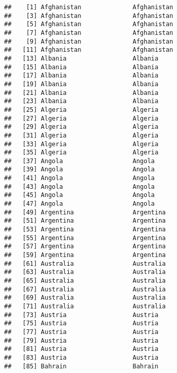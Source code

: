 \documentclass[]{article}
\begin{document}
\begin{verbatim}
##    [1] Afghanistan              Afghanistan             
##    [3] Afghanistan              Afghanistan             
##    [5] Afghanistan              Afghanistan             
##    [7] Afghanistan              Afghanistan             
##    [9] Afghanistan              Afghanistan             
##   [11] Afghanistan              Afghanistan             
##   [13] Albania                  Albania                 
##   [15] Albania                  Albania                 
##   [17] Albania                  Albania                 
##   [19] Albania                  Albania                 
##   [21] Albania                  Albania                 
##   [23] Albania                  Albania                 
##   [25] Algeria                  Algeria                 
##   [27] Algeria                  Algeria                 
##   [29] Algeria                  Algeria                 
##   [31] Algeria                  Algeria                 
##   [33] Algeria                  Algeria                 
##   [35] Algeria                  Algeria                 
##   [37] Angola                   Angola                  
##   [39] Angola                   Angola                  
##   [41] Angola                   Angola                  
##   [43] Angola                   Angola                  
##   [45] Angola                   Angola                  
##   [47] Angola                   Angola                  
##   [49] Argentina                Argentina               
##   [51] Argentina                Argentina               
##   [53] Argentina                Argentina               
##   [55] Argentina                Argentina               
##   [57] Argentina                Argentina               
##   [59] Argentina                Argentina               
##   [61] Australia                Australia               
##   [63] Australia                Australia               
##   [65] Australia                Australia               
##   [67] Australia                Australia               
##   [69] Australia                Australia               
##   [71] Australia                Australia               
##   [73] Austria                  Austria                 
##   [75] Austria                  Austria                 
##   [77] Austria                  Austria                 
##   [79] Austria                  Austria                 
##   [81] Austria                  Austria                 
##   [83] Austria                  Austria                 
##   [85] Bahrain                  Bahrain                 

\end{verbatim}
\end{document}
